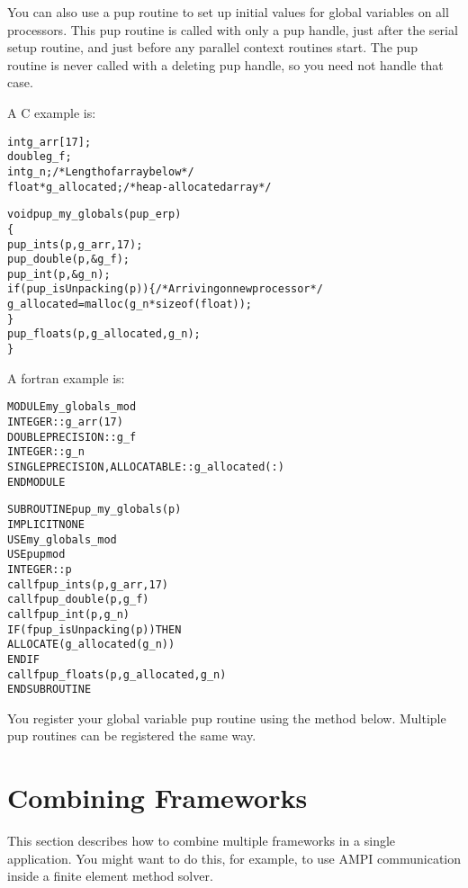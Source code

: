 \documentclass[10pt]{article}
\begin{document}
You can also use a pup routine to set up initial values for global
variables on all processors.  This pup routine is called with only
a pup handle, just after the serial setup routine, and just before 
any parallel context routines start.  The pup routine is never
called with a deleting pup handle, so you need not handle that case.

A C example is:
\begin{alltt}
     int g_arr[17];
     double g_f;
     int g_n; /*Length of array below*/
     float *g_allocated; /*heap-allocated array*/
 
     void pup_my_globals(pup_er p)
     \{
       pup_ints(p,g_arr,17);
       pup_double(p,&g_f);
       pup_int(p,&g_n);
       if (pup_isUnpacking(p)) \{ /*Arriving on new processor*/
         g_allocated=malloc(g_n*sizeof(float));
       \}
       pup_floats(p,g_allocated,g_n);
     \}
\end{alltt}

A fortran example is:
\begin{alltt}
     MODULE my_globals_mod
       INTEGER :: g_arr(17)
       DOUBLE PRECISION :: g_f
       INTEGER :: g_n
       SINGLE PRECISION, ALLOCATABLE :: g_allocated(:)
     END MODULE
 
     SUBROUTINE pup_my_globals(p)
       IMPLICIT NONE
       USE my_globals_mod
       USE pupmod
       INTEGER :: p
       call fpup_ints(p,g_arr,17)
       call fpup_double(p,g_f)
       call fpup_int(p,g_n)
       IF (fpup_isUnpacking(p)) THEN
         ALLOCATE(g_allocated(g_n))
       END IF
       call fpup_floats(p,g_allocated,g_n)
     END SUBROUTINE
\end{alltt}


You register your global variable pup routine using the method below.
Multiple pup routines can be registered the same way.

\vspace{0.2in}



\section{Combining Frameworks}
\label{sec:combining}

This section describes how to combine multiple frameworks in a 
single application.  You might want to do this, for example,
to use AMPI communication inside a finite element method solver.
\end{document}
